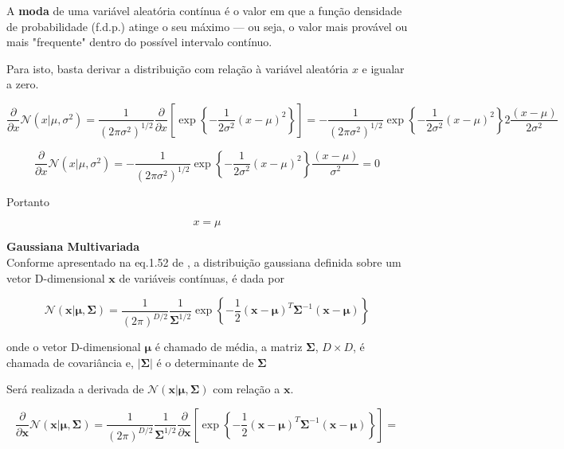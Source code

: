 \documentclass{article}
\begin{document}
  A \textbf{moda} de uma variável aleatória contínua é o valor em que a função densidade de probabilidade (f.d.p.) atinge o seu máximo — ou seja, o valor mais provável ou mais "frequente" dentro do possível intervalo contínuo. 
  
  Para isto, basta derivar a distribuição com relação à variável aleatória $x$ e igualar a zero.
  
  \[
  \frac{\partial}{\partial x} \mathcal{N} (x|\mu,\sigma^{2}) =\frac{1}{(2\pi\sigma^{2})^{1/2}} \frac{\partial}{\partial x} \left[  \exp\left\{ -\frac{1}{2\sigma^{2}}(x-\mu)^{2}\right\} \right] = -\frac{1}{(2\pi\sigma^{2})^{1/2}} \exp\left\{ -\frac{1}{2\sigma^{2}}(x-\mu)^{2}\right\} 2 \frac{(x-\mu)}{2\sigma^{2}}
  \]
  
  \[
  \frac{\partial}{\partial x} \mathcal{N} (x|\mu,\sigma^{2}) =-\frac{1}{(2\pi\sigma^{2})^{1/2}} \exp\left\{ -\frac{1}{2\sigma^{2}}(x-\mu)^{2}\right\} \frac{(x-\mu)}{\sigma^{2}} = 0
  \]
  
  Portanto
  
  \[ x = \mu \]
   

 \textbf{Gaussiana Multivariada} \\
 
  Conforme apresentado na eq.1.52 de \cite{Bishop2006}, a distribuição gaussiana definida sobre um vetor D-dimensional $\mathbf{x}$ de variáveis contínuas, é dada por
 
 	\begin{equation}
 		\mathcal{N}(\mathbf{x}|\boldsymbol{\mu},\boldsymbol{\Sigma})=\frac{1}{(2\pi)^{D/2}}\frac{1}{\boldsymbol{\Sigma}^{1/2}}\exp\left\{ -\frac{1}{2}(\mathbf{x}-\boldsymbol{\mu})^{T} \boldsymbol{\Sigma}^{-1} (\mathbf{x}-\boldsymbol{\mu})\right\}                             
 	\end{equation}
 
 	onde o vetor D-dimensional $\boldsymbol{\mu}$ é chamado de média, a matriz $\boldsymbol{\Sigma}$, $D \times D$,  é chamada de covariância e, $|\boldsymbol{\Sigma}|$ é o determinante de $\boldsymbol{\Sigma}$
 	
  Será realizada a derivada de $\mathcal{N}(\mathbf{x}|\boldsymbol{\mu},\boldsymbol{\Sigma})$ com relação a $\mathbf{x}$.
  
  
  \[
   	\frac{\partial}{\partial \mathbf{x}} \mathcal{N}(\mathbf{x}|\boldsymbol{\mu},\boldsymbol{\Sigma})=\frac{1}{(2\pi)^{D/2}}\frac{1}{\boldsymbol{\Sigma}^{1/2}}  \frac{\partial}{\partial \mathbf{x}} \left[  \exp\left\{ -\frac{1}{2}(\mathbf{x}-\boldsymbol{\mu})^{T} \boldsymbol{\Sigma}^{-1}  (\mathbf{x}-\boldsymbol{\mu})\right\} \right] =  
  \]
\end{document}
